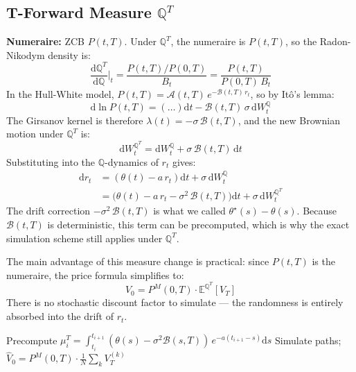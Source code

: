 \documentclass[12pt, a4paper]{article}
\newcommand{\E}{\mathbb{E}}
\newcommand{\Q}{\mathbb{Q}}
\newcommand{\diff}{\mathrm{d}}
\begin{document}
\subsection{T-Forward Measure $\Q^T$}

\textbf{Numeraire:} ZCB $P(t,T)$. Under $\Q^T$, the numeraire is $P(t,T)$, so the Radon-Nikodym density is:
\begin{equation}
\frac{\diff\Q^T}{\diff\Q}\bigg|_t = \frac{P(t,T)/P(0,T)}{B_t} = \frac{P(t,T)}{P(0,T)\,B_t}
\end{equation}
In the Hull-White model, $P(t,T) = \mathcal{A}(t,T)\,e^{-\mathcal{B}(t,T)\,r_t}$, so by Itô's lemma:
\begin{equation}
\diff\ln P(t,T) = \left(\ldots\right)\diff t - \mathcal{B}(t,T)\,\sigma\,\diff W_t^{\Q}
\end{equation}
The Girsanov kernel is therefore $\lambda(t) = -\sigma\,\mathcal{B}(t,T)$, and the new Brownian motion under $\Q^T$ is:
\begin{equation}
\diff W_t^{\Q^T} = \diff W_t^{\Q} + \sigma\,\mathcal{B}(t,T)\,\diff t
\end{equation}
Substituting into the $\Q$-dynamics of $r_t$ gives:
\begin{align}
\diff r_t &= (\theta(t) - a\,r_t)\diff t + \sigma\,\diff W_t^{\Q} \\
          &= \bigl(\theta(t) - a\,r_t - \sigma^2\,\mathcal{B}(t,T)\bigr)\diff t + \sigma\,\diff W_t^{\Q^T}
\end{align}
The drift correction $-\sigma^2\,\mathcal{B}(t,T)$ is what we called $\theta^\star(s) - \theta(s)$. Because $\mathcal{B}(t,T)$ is deterministic, this term can be precomputed, which is why the exact simulation scheme still applies under $\Q^T$.

The main advantage of this measure change is practical: since $P(t,T)$ is the numeraire, the price formula simplifies to:
\begin{equation}
V_0 = P^M(0,T) \cdot \E^{\Q^T}[V_T]
\end{equation}
There is no stochastic discount factor to simulate — the randomness is entirely absorbed into the drift of $r_t$.

\begin{algorithm}[H]
\caption{Monte Carlo under $\Q^T$ (exact scheme)}
\begin{algorithmic}[1]
\State Precompute $\mu_i^T = \int_{t_i}^{t_{i+1}} (\theta(s) - \sigma^2 \mathcal{B}(s,T))\,e^{-a(t_{i+1}-s)}\diff s$
\State Simulate paths; \quad $\hat{V}_0 = P^M(0,T) \cdot \frac{1}{N}\sum_k V_T^{(k)}$
\end{algorithmic}
\end{algorithm}
\end{document}
